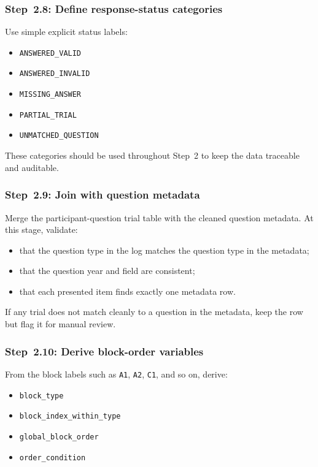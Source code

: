 \documentclass[11pt]{article}
\begin{document}
\subsubsection{Step~2.8: Define response-status categories}
Use simple explicit status labels:
\begin{itemize}
    \item \texttt{ANSWERED\_VALID}
    \item \texttt{ANSWERED\_INVALID}
    \item \texttt{MISSING\_ANSWER}
    \item \texttt{PARTIAL\_TRIAL}
    \item \texttt{UNMATCHED\_QUESTION}
\end{itemize}

These categories should be used throughout Step~2 to keep the data traceable and auditable.

\subsubsection{Step~2.9: Join with question metadata}
Merge the participant-question trial table with the cleaned question metadata.
At this stage, validate:
\begin{itemize}
    \item that the question type in the log matches the question type in the metadata;
    \item that the question year and field are consistent;
    \item that each presented item finds exactly one metadata row.
\end{itemize}

If any trial does not match cleanly to a question in the metadata, keep the row but flag it for manual review.

\subsubsection{Step~2.10: Derive block-order variables}
From the block labels such as \texttt{A1}, \texttt{A2}, \texttt{C1}, and so on, derive:
\begin{itemize}
    \item \texttt{block\_type}
    \item \texttt{block\_index\_within\_type}
    \item \texttt{global\_block\_order}
    \item \texttt{order\_condition}
\end{itemize}
\end{document}
